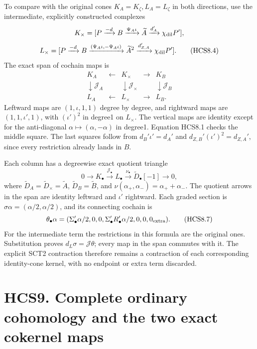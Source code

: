 To compare with the original cones \(K_A=K_\zeta,L_A=L_\zeta\) in both
directions, use the intermediate, explicitly constructed complexes \[
K_\times=[P\xrightarrow{-d}B\xrightarrow{\Psi_A\iota}
\widetilde A\xrightarrow{d_A'}\chi_{\rm dil}P'],
\] \[
L_\times=[P\xrightarrow{-d}B
\xrightarrow{(\Psi_A\iota,-\Psi_A\iota)}
\widetilde A^2\xrightarrow{d_{Z,A}'}
\chi_{\rm dil}P'].
\tag{HCS8.4}
\] The exact span of cochain maps is \[
\begin{array}{ccccc}
K_A&\longleftarrow&K_\times&\longrightarrow&K_B\\
\downarrow\mathcal J_A&&\downarrow\mathcal J_\times&&
\downarrow\mathcal J_B\\
L_A&\longleftarrow&L_\times&\longrightarrow&L_B .
\end{array}
\tag{HCS8.5}
\] Leftward maps are \((1,\iota,1,1)\) degree by degree, and rightward
maps are \((1,1,\iota',1)\), with \((\iota')^2\) in degree1 on
\(L_\times\). The vertical maps are identity except for the
anti-diagonal \(\alpha\mapsto(\alpha,-\alpha)\) in degree1. Equation
HCS8.1 checks the middle square. The last squares follow from
\(d_B'\iota'=d_A'\) and \(d_{Z,B}'(\iota')^2=d_{Z,A}'\), since every
restriction already lands in \(B\).

Each column has a degreewise exact quotient triangle \[
0\to K_\bullet\xrightarrow{\mathcal J_\bullet}L_\bullet
\xrightarrow{\nu_\bullet}\widetilde D_\bullet[-1]\to0,
\tag{HCS8.6}
\] where \(\widetilde D_A=\widetilde D_\times=\widetilde A\),
\(\widetilde D_B=\widetilde B\), and
\(\nu(\alpha_+,\alpha_-)=\alpha_++\alpha_-\). The quotient arrows in the
span are identity leftward and \(\iota'\) rightward. Each graded section
is \(\sigma\alpha=(\alpha/2,\alpha/2)\), and its connecting cochain is
\[
\theta_\bullet\alpha=
(\Sigma_\bullet'\alpha/2,0,0,
\Sigma_\bullet'R_\bullet'\alpha/2,0,0,0_{\rm extra}).
\tag{HCS8.7}
\] For the intermediate term the restrictions in this formula are the
original ones. Substitution proves \(d_L\sigma=\mathcal J\theta\); every
map in the span commutes with it. The explicit SCT2 contraction
therefore remains a contraction of each corresponding identity-cone
kernel, with no endpoint or extra term discarded.

\section{HCS9. Complete ordinary cohomology and the two exact cokernel
maps}\label{hcs9.-complete-ordinary-cohomology-and-the-two-exact-cokernel-maps}

